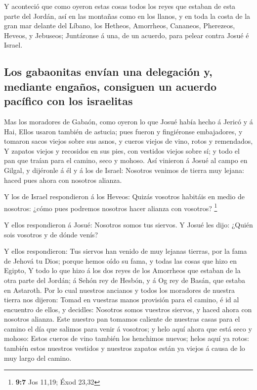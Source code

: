  Y aconteció que como oyeron estas cosas todos los reyes
que estaban de esta parte del Jordán, así en las montañas como en los
llanos, y en toda la costa de la gran mar delante del Líbano, los
Hetheos, Amorrheos, Cananeos, Pherezeos, Heveos, y Jebuseos;
 Juntáronse á una, de un acuerdo, para pelear contra Josué
é Israel.

\hypertarget{los-gabaonitas-envuxedan-una-delegaciuxf3n-y-mediante-engauxf1os-consiguen-un-acuerdo-pacuxedfico-con-los-israelitas}{%
\subsection{Los gabaonitas envían una delegación y, mediante engaños,
consiguen un acuerdo pacífico con los
israelitas}\label{los-gabaonitas-envuxedan-una-delegaciuxf3n-y-mediante-engauxf1os-consiguen-un-acuerdo-pacuxedfico-con-los-israelitas}}

 Mas los moradores de Gabaón, como oyeron lo que Josué
había hecho á Jericó y á Hai,  Ellos usaron también de
astucia; pues fueron y fingiéronse embajadores, y tomaron sacos viejos
sobre sus asnos, y cueros viejos de vino, rotos y remendados,
 Y zapatos viejos y recosidos en sus pies, con vestidos
viejos sobre sí; y todo el pan que traían para el camino, seco y mohoso.
 Así vinieron á Josué al campo en Gilgal, y dijéronle á él
y á los de Israel: Nosotros venimos de tierra muy lejana: haced pues
ahora con nosotros alianza.

 Y los de Israel respondieron á los Heveos: Quizás
vosotros habitáis en medio de nosotros: ¿cómo pues podremos nosotros
hacer alianza con vosotros? \footnote{\textbf{9:7} Jos 11,19; Éxod 23,32}

 Y ellos respondieron á Josué: Nosotros somos tus siervos.
Y Josué les dijo: ¿Quién sois vosotros y de dónde venís?

 Y ellos respondieron: Tus siervos han venido de muy
lejanas tierras, por la fama de Jehová tu Dios; porque hemos oído su
fama, y todas las cosas que hizo en Egipto,  Y todo lo
que hizo á los dos reyes de los Amorrheos que estaban de la otra parte
del Jordán; á Sehón rey de Hesbón, y á Og rey de Basán, que estaba en
Astaroth.  Por lo cual nuestros ancianos y todos los
moradores de nuestra tierra nos dijeron: Tomad en vuestras manos
provisión para el camino, é id al encuentro de ellos, y decidles:
Nosotros somos vuestros siervos, y haced ahora con nosotros alianza.
 Este nuestro pan tomamos caliente de nuestras casas para
el camino el día que salimos para venir á vosotros; y helo aquí ahora
que está seco y mohoso:  Estos cueros de vino también los
henchimos nuevos; helos aquí ya rotos: también estos nuestros vestidos y
nuestros zapatos están ya viejos á causa de lo muy largo del camino.

